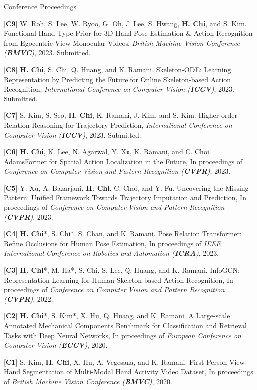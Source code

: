 \begin{cventries}
\cvpub
{Conference Proceedings} %
{ %
\begin{cvitems}
    \item {[\textbf{C9}] W. Roh, S. Lee, W. Ryoo, G. Oh, J. Lee, S. Hwang, \textbf{H. Chi}, and S. Kim. Functional Hand Type Prior for 3D Hand Pose Estimation \& Action Recognition from Egocentric View Monocular Videos, \textit{British Machine Vision Conference (\textbf{BMVC})}, 2023. Submitted.}
    \item {[\textbf{C8}] \textbf{H. Chi}, S. Chi, Q. Huang, and K. Ramani. Skeleton-ODE: Learning Representation by Predicting the Future for Online Skeleton-based Action Recognition, \textit{International Conference on Computer Vision (\textbf{ICCV})}, 2023. Submitted.}
    \item {[\textbf{C7}] S. Kim, S. Seo, \textbf{H. Chi}, K. Ramani, J. Kim, and S. Kim. Higher-order Relation Reasoning for Trajectory Prediction, \textit{International Conference on Computer Vision (\textbf{ICCV})}, 2023. Submitted.}
    \item {[\textbf{C6}] \textbf{H. Chi}, K. Lee, N. Agarwal, Y. Xu, K. Ramani, and C. Choi. AdamsFormer for Spatial Action Localization in the Future, In proceedings of \textit{Conference on Computer Vision and Pattern Recognition (\textbf{CVPR})}, 2023.}
    \item {[\textbf{C5}] Y. Xu, A. Bazarjani, \textbf{H. Chi}, C. Choi, and Y. Fu. Uncovering the Missing Pattern: Unified Framework Towards Trajectory Imputation and Prediction, In proceedings of \textit{Conference on Computer Vision and Pattern Recognition (\textbf{CVPR})}, 2023.}
    \item {[\textbf{C4}] \textbf{H. Chi}*, S. Chi*, S. Chan, and K. Ramani. Pose Relation Transformer: Refine Occlusions for Human Pose Estimation, In proceedings of \textit{IEEE International Conference on Robotics and Automation (\textbf{ICRA})}, 2023.}
    \item {[\textbf{C3}] \textbf{H. Chi}*, M. Ha*, S. Chi, S. Lee, Q. Huang, and K. Ramani. InfoGCN: Representation Learning for Human Skeleton-based Action Recognition, In proceedings of \textit{Conference on Computer Vision and Pattern Recognition (\textbf{CVPR})}, 2022.}
    \item {[\textbf{C2}] \textbf{H. Chi}*, S. Kim*, X. Hu, Q. Huang, and K. Ramani. A Large-scale Annotated Mechanical Components Benchmark for Classification and Retrieval Tasks with Deep Neural Networks, In proceedings of \textit{European Conference on Computer Vision (\textbf{ECCV})}, 2020.}
    \item {[\textbf{C1}] S. Kim, \textbf{H. Chi}, X. Hu, A. Vegesana, and K. Ramani. First-Person View Hand Segmentation of Multi-Modal Hand Activity Video Dataset, In proceedings of \textit{British Machine Vision Conference (\textbf{BMVC})}, 2020.}
\end{cvitems}
}


\end{cventries}
